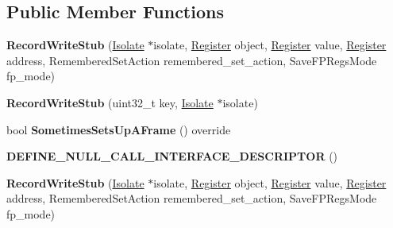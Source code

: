 \subsection*{Public Member Functions}
\begin{DoxyCompactItemize}
\item 
{\bfseries Record\+Write\+Stub} (\hyperlink{classv8_1_1internal_1_1_isolate}{Isolate} $\ast$isolate, \hyperlink{structv8_1_1internal_1_1_register}{Register} object, \hyperlink{structv8_1_1internal_1_1_register}{Register} value, \hyperlink{structv8_1_1internal_1_1_register}{Register} address, Remembered\+Set\+Action remembered\+\_\+set\+\_\+action, Save\+F\+P\+Regs\+Mode fp\+\_\+mode)\hypertarget{classv8_1_1internal_1_1_record_write_stub_a6f773cf58e28bfb7b2c5da464fd3f145}{}\label{classv8_1_1internal_1_1_record_write_stub_a6f773cf58e28bfb7b2c5da464fd3f145}

\item 
{\bfseries Record\+Write\+Stub} (uint32\+\_\+t key, \hyperlink{classv8_1_1internal_1_1_isolate}{Isolate} $\ast$isolate)\hypertarget{classv8_1_1internal_1_1_record_write_stub_a9442f95c68a538cf8d22e7f5a7a247b5}{}\label{classv8_1_1internal_1_1_record_write_stub_a9442f95c68a538cf8d22e7f5a7a247b5}

\item 
bool {\bfseries Sometimes\+Sets\+Up\+A\+Frame} () override\hypertarget{classv8_1_1internal_1_1_record_write_stub_a636954d69a10f35b09d319f92e167699}{}\label{classv8_1_1internal_1_1_record_write_stub_a636954d69a10f35b09d319f92e167699}

\item 
{\bfseries D\+E\+F\+I\+N\+E\+\_\+\+N\+U\+L\+L\+\_\+\+C\+A\+L\+L\+\_\+\+I\+N\+T\+E\+R\+F\+A\+C\+E\+\_\+\+D\+E\+S\+C\+R\+I\+P\+T\+OR} ()\hypertarget{classv8_1_1internal_1_1_record_write_stub_a886f020173ce417f40c5704f6a582d6f}{}\label{classv8_1_1internal_1_1_record_write_stub_a886f020173ce417f40c5704f6a582d6f}

\item 
{\bfseries Record\+Write\+Stub} (\hyperlink{classv8_1_1internal_1_1_isolate}{Isolate} $\ast$isolate, \hyperlink{structv8_1_1internal_1_1_register}{Register} object, \hyperlink{structv8_1_1internal_1_1_register}{Register} value, \hyperlink{structv8_1_1internal_1_1_register}{Register} address, Remembered\+Set\+Action remembered\+\_\+set\+\_\+action, Save\+F\+P\+Regs\+Mode fp\+\_\+mode)\hypertarget{classv8_1_1internal_1_1_record_write_stub_a6f773cf58e28bfb7b2c5da464fd3f145}{}\label{classv8_1_1internal_1_1_record_write_stub_a6f773cf58e28bfb7b2c5da464fd3f145}


\end{DoxyCompactItemize}
